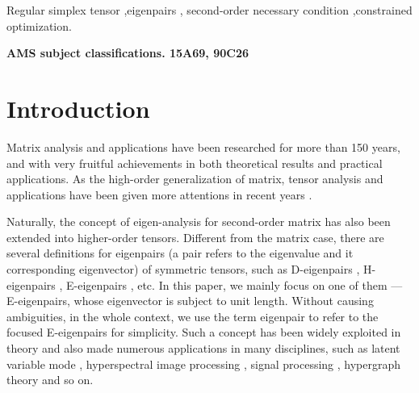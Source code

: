 \documentclass{elsarticle}
\begin{document}
\begin{keyword}
	Regular simplex tensor \sep  eigenpairs \sep   
	 second-order   necessary condition \sep    constrained optimization.
\end{keyword}

\maketitle
\textbf{AMS subject classifications. 15A69,	90C26}





\section{Introduction }
Matrix  analysis and   applications  have been researched for more than 
150 years,
and with very  fruitful  achievements in  both  theoretical  results and  practical applications.
As  the high-order  generalization of  matrix,  tensor   analysis and  applications have  been  given   more   attentions in  recent  years \cite{kolda,2007Numerical,hosvd,tensorrank_qi,TensorPCA,RobustTensorCompletion,TensorDiagonalization,TensorApproximation}. 


 Naturally, 
 the concept of  eigen-analysis for  second-order matrix  
has also    been    extended  into    higher-order  tensors.
Different  from  the matrix  case,    there are several  definitions for eigenpairs (a pair refers to the eigenvalue and it   corresponding eigenvector)  of symmetric tensors, such as   D-eigenpairs \cite{Deigen}, H-eigenpairs  \cite{qi},  E-eigenpairs  \cite{lim,qi},   etc.  
In this paper,  we mainly  focus  on  one of them ---  E-eigenpairs, whose eigenvector is  subject to    unit length.  
Without causing  ambiguities, 
in the whole context, 
we use  the  term eigenpair  to refer to the focused  E-eigenpairs  for simplicity. 
Such a concept has been widely exploited  in  theory \cite{SHOPM,ASHOPM,NCM,OTD,Cuicf,hm,Zglobal}  and also  
made 
numerous  applications   in  many disciplines, such as latent  variable mode \cite{Hsu}, hyperspectral  image processing \cite{PSA, NPSA,MSDP}, 
signal processing \cite{tensor_bss1},  hypergraph theory \cite{hypergraph,hypergraph3} and so on. 
\end{document}
